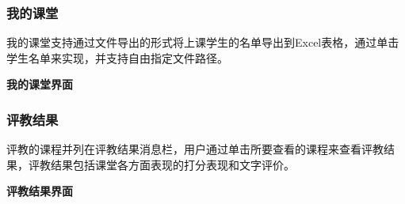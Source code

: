 \documentclass{article}
\begin{document}
\subsubsection{我的课堂}
我的课堂支持通过文件导出的形式将上课学生的名单导出到Excel表格，通过单击学生名单来实现，并支持自由指定文件路径。
\begin{center}
\textbf{我的课堂界面}
\end{center}

\subsubsection{评教结果}
评教的课程并列在评教结果消息栏，用户通过单击所要查看的课程来查看评教结果，评教结果包括课堂各方面表现的打分表现和文字评价。
\begin{center}
\textbf{评教结果界面}
\end{center}
\end{document}

